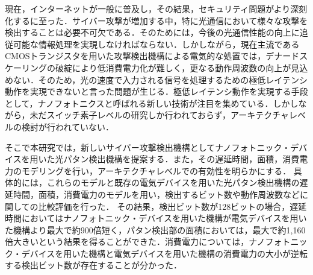 \documentclass{yokou}
\begin{document}
\begin{contentyokou}
現在，インターネットが一般に普及し，その結果，セキュリティ問題がより深刻化するに至った．サイバー攻撃が増加する中，特に光通信において様々な攻撃を検出することは必要不可欠である．そのためには，今後の光通信性能の向上に追従可能な情報処理を実現しなければならない．しかしながら，現在主流であるCMOSトランジスタを用いた攻撃検出機構による電気的な処置では，デナードスケーリングの破綻により低消費電力化が難しく，更なる動作周波数の向上が見込めない．そのため，光の速度で入力される信号を処理するための極低レイテンシ動作を実現できないと言った問題が生じる．極低レイテンシ動作を実現する手段として，ナノフォトニクスと呼ばれる新しい技術が注目を集めている．しかしながら，未だスイッチ素子レベルの研究しか行われておらず，アーキテクチャレベルの検討が行われていない．

そこで本研究では，新しいサイバー攻撃検出機構としてナノフォトニック・デバイスを用いた光パタン検出機構を提案する．また，その遅延時間，面積，消費電力のモデリングを行い，アーキテクチャレベルでの有効性を明らかにする．
具体的には，これらのモデルと既存の電気デバイスを用いた光パタン検出機構の遅延時間，面積，消費電力のモデルを用い，検出するビット数や動作周波数などに関しての比較評価を行った．
その結果，検出ビット数が128ビットの場合，遅延時間においてはナノフォトニック・デバイスを用いた機構が電気デバイスを用いた機構より最大で約900倍短く，パタン検出部の面積においては，最大で約1,160倍大きいという結果を得ることができた．消費電力については，ナノフォトニック・デバイスを用いた機構と電気デバイスを用いた機構の消費電力の大小が逆転する検出ビット数が存在することが分かった．


\end{contentyokou}
\end{document}
